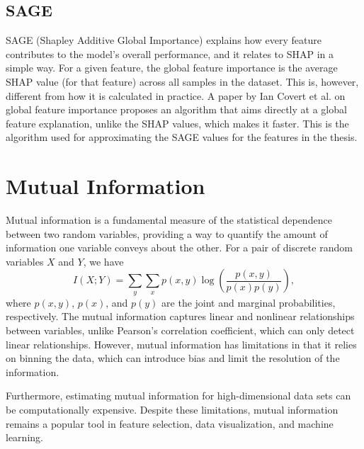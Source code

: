 \subsection{SAGE}
SAGE (Shapley Additive Global Importance) explains how every feature contributes to the model's overall performance, and it relates to SHAP in a simple way.
For a given feature, the global feature importance is the average SHAP value (for that feature) across all samples in the dataset.
This is, however, different from how it is calculated in practice.
A paper by Ian Covert et al.
\cite{sage_paper} on global feature importance proposes an algorithm that aims directly at a global feature explanation, unlike the SHAP values, which makes
it faster.
This is the algorithm used for approximating the SAGE values for the features in the thesis.

\section{Mutual Information}
Mutual information is a fundamental measure of the statistical dependence between two random variables,
providing a way to quantify the amount of information one variable conveys about the other.
For a pair of discrete random variables $X$ and $Y$, we have 
\begin{equation}
    I(X;Y) = \sum_{y} \sum_{x} p(x,y) \log \left( \frac{p(x,y)}{p(x)p(y)} \right),
\end{equation}
where $p(x,y)$, $p(x)$, and $p(y)$ are the joint and marginal probabilities, respectively.
The mutual information captures linear and nonlinear relationships between variables, unlike Pearson's correlation coefficient, which can only detect linear relationships.
However, mutual information has limitations in that it relies on binning the data, which can introduce bias and limit the resolution of the information.
   
Furthermore, estimating mutual information for high-dimensional data sets can be computationally expensive.
Despite these limitations, mutual information remains a popular tool in feature selection, data visualization, and machine learning.